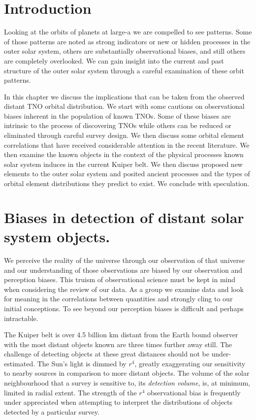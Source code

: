 \documentclass{aastex62}
\begin{document}
\section{Introduction}

Looking at the orbits of planets at large-a we are compelled to see
patterns. Some of those patterns are noted as strong
indicators or new or hidden processes in the outer solar system,
others are substantially observational biases, and still others are
completely overlooked. We can gain insight into the current and past
structure of the outer solar system through a careful examination of
these orbit patterns.

In this chapter we discuss the implications that can be taken from the observed distant TNO orbital distribution.  We start with some cautions on observational biases inherent in the population of known TNOs.  Some of these biases are intrinsic to the process of discovering TNOs while others can be reduced or eliminated through careful survey design. We then discuss some orbital element correlations that have received considerable attention in the recent literature. We then examine the known objects in the context of the physical processes known solar system induces in the current Kuiper belt.  We then discuss proposed new elements to the outer solar system and posited ancient processes and the types of orbital element distributions they predict to exist.  We conclude with speculation.

\section{Biases in detection of distant solar system objects.}

We perceive the reality of the universe through our observation of that universe and our understanding of those observations are biased by our observation and perception biases. This truism of observational science must be kept in mind when considering the review of our data. As a group we examine data and look for meaning in the correlations between quantities and strongly cling to our initial conceptions.  To see beyond our perception biases is difficult and perhaps intractable. 

The Kuiper belt is over 4.5 billion km distant from the Earth bound observer with the most distant objects known are three times further away still.  The challenge of detecting objects at these great distances should not be under-estimated.  The Sun's light is dimmed by $r^4$, greatly exaggerating our sensitivity to nearby sources in comparison to more distant objects.  The volume of the solar neighbourhood that a survey is sensitive to, its {\it detection volume},  is, at minimum, limited in radial extent. The strength of the $r^4$ observational bias is frequently under appreciated when attempting to interpret the distributions of objects detected by a particular survey.
\end{document}
